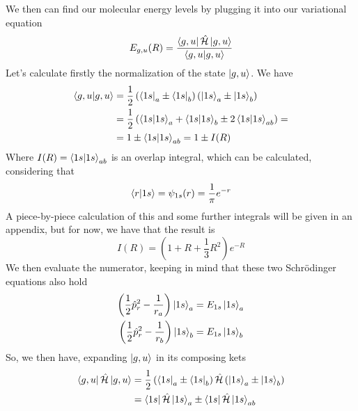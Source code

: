 \documentclass[../qm.tex]{subfiles}
\begin{document}
	We then can find our molecular energy levels by plugging it into our variational equation
	\begin{equation*}
		E_{g,u}(R)=\frac{\bra{g,u}\hat{\mathcal{H}}\ket{g,u}}{\bra{g,u}\ket{g,u}}
	\end{equation*}
	Let's calculate firstly the normalization of the state $\ket{g,u}$. We have
	\begin{equation}
		\begin{aligned}
			\bra{g,u}\ket{g,u}&=\frac{1}{2}\left( \bra{1s}_a\pm\bra{1s}_b \right)\left( \ket{1s}_a\pm\ket{1s}_b \right)\\
			&=\frac{1}{2}\left( \bra{1s}\ket{1s}_a+\bra{1s}\ket{1s}_b\pm2\bra{1s}\ket{1s}_{ab} \right)=\\
			&=1\pm\bra{1s}\ket{1s}_{ab}=1\pm I(R)
		\end{aligned}
		\label{eq:normalizationguh2plus}
	\end{equation}
	Where $I(R)=\bra{1s}\ket{1s}_{ab}$ is an overlap integral, which can be calculated, considering that
	\begin{equation*}
		\bra{r}\ket{1s}=\psi_{1s}(r)=\frac{1}{\pi}e^{-r}
	\end{equation*}
	A piece-by-piece calculation of this and some further integrals will be given in an appendix, but for now, we have that the result is
	\begin{equation*}
		I(R)=\left( 1+R+\frac{1}{3}R^2 \right)e^{-R}
	\end{equation*}
	We then evaluate the numerator, keeping in mind that these two Schrödinger equations also hold
	\begin{equation*}
		\begin{aligned}
			\left( \frac{1}{2}\hat{p}^2_r-\frac{1}{r_a} \right)\ket{1s}_a&=E_{1s}\ket{1s}_a\\
			\left( \frac{1}{2}\hat{p}^2_r-\frac{1}{r_b} \right)\ket{1s}_b&=E_{1s}\ket{1s}_b
		\end{aligned}
	\end{equation*}
	So, we then have, expanding $\ket{g,u}$ in its composing kets
	\begin{equation}
		\begin{aligned}
			\bra{g,u}\hat{\mathcal{H}}\ket{g,u}&=\frac{1}{2}\left( \bra{1s}_a\pm\bra{1s}_b \right)\hat{\mathcal{H}}\left( \ket{1s}_a\pm\ket{1s}_b \right)\\
			&=\bra{1s}\hat{\mathcal{H}}\ket{1s}_a\pm\bra{1s}\hat{\mathcal{H}}\ket{1s}_{ab}
		\end{aligned}
		\label{eq:numeratorvariationalh2plus}
	\end{equation}
\end{document}
